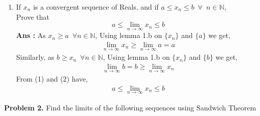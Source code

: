 \documentclass[10pt]{article}
\newcommand{\nn}{\mathbb{N}}
\newcommand{\inflim}{\lim_{n\to\infty}}
\newcommand{\sol}{\textbf{Ans : }}
\begin{document}
\begin{enumerate}[label = {(\alph*)}]
        \item If $x_n$ is a convergent sequence of Reals, and if $a \leq x_n \leq b \,\,\, \forall \,\,\, n\in\nn$,\\ Prove that $$a\leq\inflim x_n \leq b$$
        \sol As $x_n \geq a \,\,\,\forall n \in \nn$, Using lemma 1.b on $\{x_n\}$ and $\{a\}$ we get, \begin{align*}\inflim x_n \geq \inflim a = a \tag{1}\end{align*} Similarly,  as $b \geq x_n \,\,\,\forall n \in \nn$, Using lemma 1.b on $\{x_n\}$ and $\{b\}$ we get, \begin{align*}\inflim b = b \geq \inflim x_n \tag{2}\end{align*} From (1) and (2) have, 
        \begin{align*}
        a\leq\inflim x_n \leq b \tag*{\qed}
        \end{align*} 
        \end{enumerate} \clearpage
        \textbf{Problem 2.} Find the limits of the following sequences using Sandwich Theorem
\end{document}
